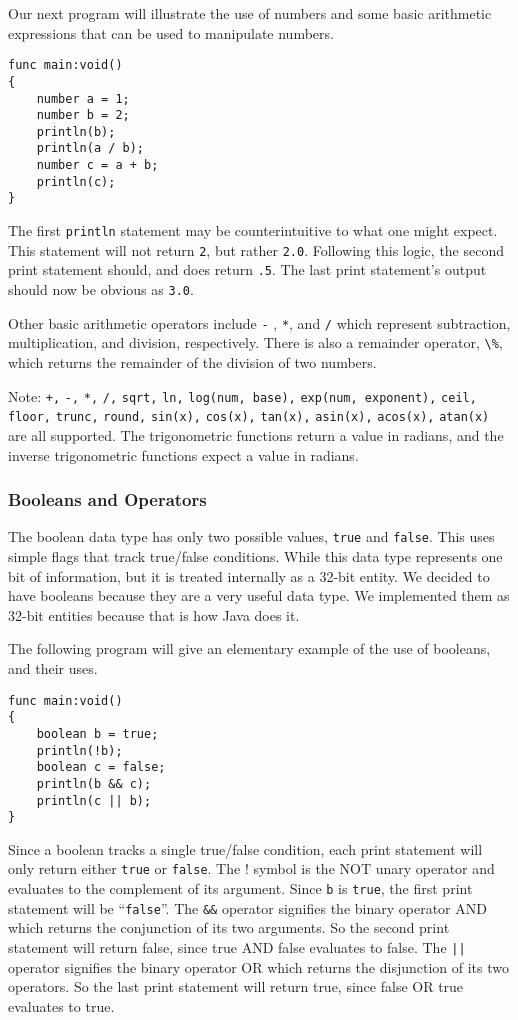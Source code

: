 Our next program will illustrate the use of numbers and some basic arithmetic
expressions that can be used to manipulate numbers.

\begin{verbatim}
func main:void()
{
    number a = 1;
    number b = 2;
    println(b);
    println(a / b);
    number c = a + b;
    println(c);
}
\end{verbatim}

The first \verb=println= statement may be counterintuitive to what one might
expect.  This statement will not return \verb=2=, but rather \verb=2.0=.
Following this logic, the second print statement should, and does return
\verb=.5=.  The last print statement's output should now be obvious as
\verb=3.0=.

Other basic arithmetic operators include \verb=-= , \verb=*=, and \verb=/= which
represent subtraction, multiplication, and division, respectively.  There is
also a remainder operator, \verb=\%=,  which returns the remainder of the
division of two numbers.

Note: \verb=+,= \verb=-,= \verb=*,= \verb=/,= \verb=sqrt,= \verb=ln,=
\verb=log(num, base),= \verb=exp(num, exponent),= \verb=ceil,= \verb=floor,=
\verb=trunc,= \verb=round,= \verb=sin(x),= \verb=cos(x),= \verb=tan(x),=
\verb=asin(x),= \verb=acos(x),= \verb=atan(x)= are all supported. The
trigonometric functions return a value in radians, and the inverse trigonometric
functions expect a value in radians.

\subsubsection{Booleans and Operators}
The boolean data type has only two possible values, \verb=true= and
\verb=false=.  This uses simple flags that track true/false conditions. While
this data type represents one bit of information, but it is treated internally
as a 32-bit entity. We decided to have booleans because they are a very useful
data type. We implemented them as 32-bit entities because that is how Java does
it.

The following program will give an elementary example of the use of booleans, and their uses.  

\begin{verbatim}
func main:void()
{
    boolean b = true;
    println(!b);
    boolean c = false;
    println(b && c);
    println(c || b);  
}
\end{verbatim}

Since a boolean tracks a single true/false condition, each print statement will
only return either \verb=true= or \verb=false=.  The ! symbol is the NOT unary
operator and evaluates to the complement of its argument.  Since \verb=b= is
\verb=true=, the first print statement will be ``\verb=false=''.  The \verb=&&=
operator signifies the binary operator AND which returns the conjunction of its
two arguments.  So the second print statement will return false, since true AND
false evaluates to false. The \verb=||= operator signifies the binary operator
OR which returns the disjunction of its two operators.  So the last print
statement will return true, since false OR true evaluates to true. 

